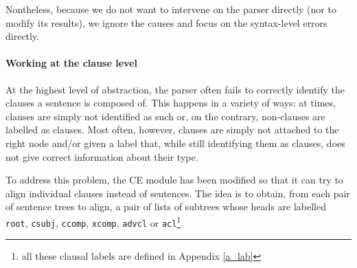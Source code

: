 Nontheless, because we do not want to intervene on the parser directly (nor to modify its results), we ignore the causes and focus on the syntax-level errors directly. \smallskip

\paragraph{Working at the clause level} \label{clauses}
At the highest level of abstraction, the parser often fails to correctly identify the clauses a sentence is composed of. 
This happens in a variety of ways: at times, clauses are simply not identified as such or, on the contrary, non-clauses are labelled as clauses. 
Most often, however, clauses are simply not attached to the right node and/or given a label that, while still identifying them as clauses, does not give correct information about their type. \smallskip

To address this problem, the CE module has been modified so that it can try to align individual clauses instead of sentences. 
The idea is to obtain, from each pair of sentence trees to align, a pair of lists of subtrees whose heads are labelled \texttt{root}, \texttt{csubj}, \texttt{ccomp}, \texttt{xcomp}, \texttt{advcl} or  \texttt{acl}\footnote{all these clausal labels are defined in Appendix \ref{a_lab}}.

